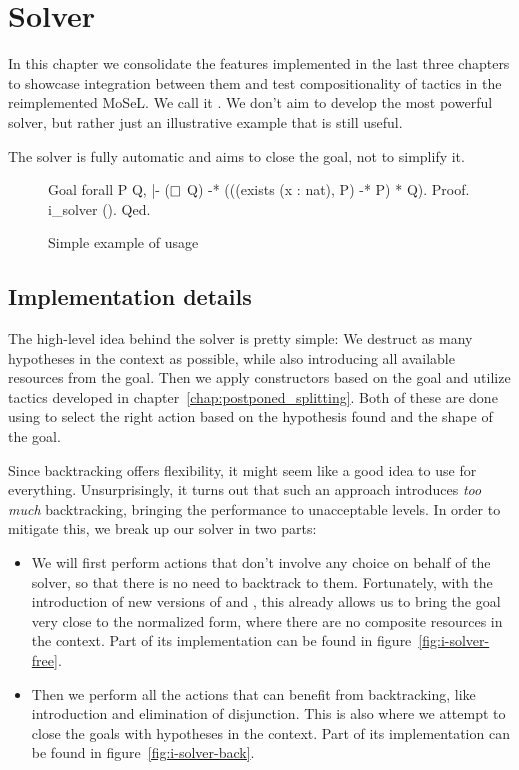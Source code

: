 \chapter{Solver}
\label{chap:solver}

In this chapter we consolidate the features implemented in the last three chapters to showcase integration between them and test compositionality of tactics in the reimplemented MoSeL.
We call it .
We don't aim to develop the most powerful solver, but rather just an illustrative example that is still useful.

The solver is fully automatic and aims to close the goal, not to simplify it.

\begin{figure}[H]
\begin{coq}
Goal forall P Q, |- ($\mathop{\Box}$ Q) -* (((exists (x : nat), P) -* P) * Q).
Proof. i_solver (). Qed.
\end{coq}
  \caption{Simple example of  usage}
  \label{fig:i-solver-init-example}
\end{figure}

\section{Implementation details}
\label{sec:i-solver-implementation-idea}

The high-level idea behind the solver is pretty simple:
We destruct as many hypotheses in the context as possible, while also introducing all available resources from the goal.
Then we apply constructors based on the goal and utilize tactics developed in chapter~\ref{chap:postponed_splitting}.
Both of these are done using  to select the right action based on the hypothesis found and the shape of the goal.

Since backtracking offers flexibility, it might seem like a good idea to use  for everything.
Unsurprisingly, it turns out that such an approach introduces \emph{too much} backtracking, bringing the performance to unacceptable levels.
In order to mitigate this, we break up our solver in two parts:
\begin{itemize}
\item We will first perform actions that don't involve any choice on behalf of the solver, so that there is no need to backtrack to them.
  Fortunately, with the introduction of new versions of  and , this already allows us to bring the goal very close to the normalized form, where there are no composite resources in the context.
  Part of its implementation can be found in figure~\ref{fig:i-solver-free}.
\item Then we perform all the actions that can benefit from backtracking, like introduction and elimination of disjunction.
  This is also where we attempt to close the goals with hypotheses in the context.
  Part of its implementation can be found in figure~\ref{fig:i-solver-back}.
\end{itemize}

